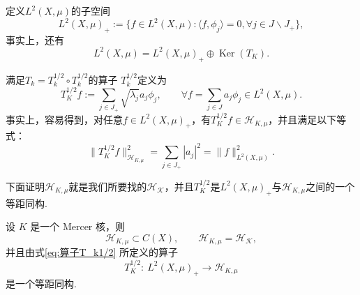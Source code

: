 \documentclass[../master.tex]{subfiles}
\begin{document}
定义$L^2(X,\mu)$的子空间
\begin{equation*}
    L^2(X,\mu)_+:=\{f\in L^2(X,\mu):\langle f,\phi_j\rangle = 0,\forall j\in J\backslash J_+\},
\end{equation*}
事实上，还有
\begin{equation*}
    L^2(X,\mu) = L^2(X,\mu)_+ \oplus \operatorname{Ker}(T_K).
\end{equation*}

满足\(T_k = T_k^{1/2}\circ T_k^{1/2}\)的算子 \(T_k^{1/2}\)定义为
\begin{equation}\label{eq:算子T_k1/2}
    T_K^{1/2}f:=\sum_{j\in J_+}\sqrt{\lambda_j}a_j\phi_j,\qquad \forall f=\sum_{j\in J}a_j\phi_j\in L^2(X,\mu).
\end{equation}
事实上，容易得到，对任意$f\in L^2(X,\mu)_+$，有$T_K^{1/2}f\in \mathcal{H}_{K,\mu}$，并且满足以下等式：
\begin{equation}\label{eq:等距同构}
    \|T_K^{1/2}f\|_{\mathcal{H}_{K,\mu}}^2 = \sum_{j\in J_+}|a_j|^2 = \|f\|^2_{L^2(X,\mu)}.
\end{equation}

下面证明$\mathcal{H}_{K,\mu}$就是我们所要找的$\mathcal{H_K}$，并且$T_K^{1/2}$是$ L^2(X,\mu)_+$与$\mathcal{H}_{K,\mu}$之间的一个等距同构.

\begin{theorem}\label{thm:Mercer-isometry}
设 $K$ 是一个 Mercer 核，则
\[
\mathcal{H}_{K,\mu}\subset C(X), \qquad \mathcal{H}_{K,\mu}=\mathcal {H_K},
\]
并且由式\eqref{eq:算子T_k1/2} 所定义的算子
\[
T_{K}^{1/2}:~L^{2}(X,\mu)_{+}\longrightarrow \mathcal{H}_{K,\mu}
\]
是一个等距同构.
\end{theorem}
\end{document}

